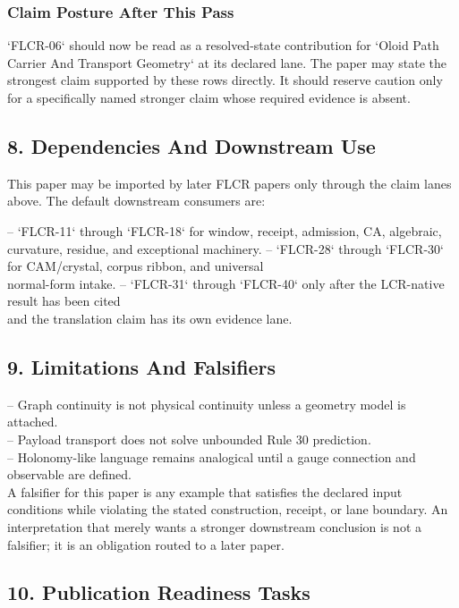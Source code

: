 \documentclass[11pt]{article}
\begin{document}
\subsubsection*{Claim Posture After This Pass}

`FLCR-06` should now be read as a resolved-state contribution for `Oloid Path Carrier And Transport Geometry` at its declared lane. The paper may state the strongest claim supported by these rows directly. It should reserve caution only for a specifically named stronger claim whose required evidence is absent.

\subsection*{8. Dependencies And Downstream Use}

This paper may be imported by later FLCR papers only through the claim lanes
above. The default downstream consumers are:

\noindent{}-- `FLCR-11` through `FLCR-18` for window, receipt, admission, CA, algebraic,\\
  curvature, residue, and exceptional machinery.
\noindent{}-- `FLCR-28` through `FLCR-30` for CAM/crystal, corpus ribbon, and universal\\
  normal-form intake.
\noindent{}-- `FLCR-31` through `FLCR-40` only after the LCR-native result has been cited\\
  and the translation claim has its own evidence lane.

\subsection*{9. Limitations And Falsifiers}

\noindent{}-- Graph continuity is not physical continuity unless a geometry model is attached.\\
\noindent{}-- Payload transport does not solve unbounded Rule 30 prediction.\\
\noindent{}-- Holonomy-like language remains analogical until a gauge connection and observable are defined.\\

A falsifier for this paper is any example that satisfies the declared input
conditions while violating the stated construction, receipt, or lane boundary.
An interpretation that merely wants a stronger downstream conclusion is not a
falsifier; it is an obligation routed to a later paper.

\subsection*{10. Publication Readiness Tasks}
\end{document}

